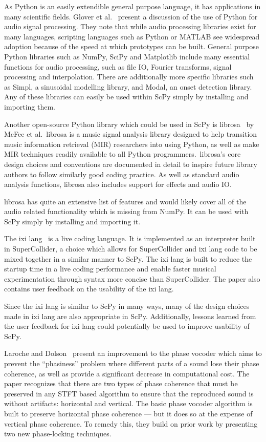\documentclass{article}
\begin{document}
As Python is an easily extendible general purpose language, it has applications in many scientific
fields. Glover et al.~\cite{glover2011python} present a discussion of the use of Python for audio
signal processing. They note that while audio processing libraries exist for many languages,
scripting languages such as Python or MATLAB see widespread adoption because of the speed at which
prototypes can be built. General purpose Python libraries such as NumPy, SciPy and Matplotlib
include many essential functions for audio processing, such as file IO, Fourier transforms, signal
processing and interpolation. There are additionally more specific libraries such as Simpl, a
sinusoidal modelling library, and Modal, an onset detection library. Any of these libraries can
easily be used within ScPy simply by installing and importing them.

Another open-source Python library which could be used in ScPy is librosa~\cite{mcfee2015librosa}
by McFee et al.\ librosa is a music signal analysis library designed to help transition music
information retrieval (MIR) researchers into using Python, as well as make MIR techniques readily
available to all Python programmers.\ librosa's core design choices and conventions are documented
in detail to inspire future library authors to follow similarly good coding practice. As well as
standard audio analysis functions, librosa also includes support for effects and audio IO.\@

librosa has quite an extensive list of features and would likely cover all of the audio related
functionality which is missing from NumPy. It can be used with ScPy simply by installing and importing
it.

The ixi lang~\cite{magnusson2011ixi} is a live coding language. It is implemented as an interpreter
built in SuperCollider, a choice which allows for SuperCollider and ixi lang code to be mixed
together in a similar manner to ScPy. The ixi lang is built to reduce the startup time in a live
coding performance and enable faster musical experimentation through syntax more concise than
SuperCollider. The paper also contains user feedback on the usability of the ixi lang.

Since the ixi lang is similar to ScPy in many ways, many of the design choices made in ixi lang are
also appropriate in ScPy. Additionally, lessons learned from the user feedback for ixi lang could
potentially be used to improve usability of ScPy.

Laroche and Dolson~\cite{laroche1999improved} present an improvement to the phase vocoder which
aims to prevent the ``phasiness'' problem where different parts of a sound lose their phase
coherence, as well as provide a significant decrease in computational cost. The paper recognizes
that there are two types of phase coherence that must be preserved in any STFT based algorithm to
ensure that the reproduced sound is without artifacts: horizontal and vertical. The basic phase
vocoder algorithm is built to preserve horizontal phase coherence --- but it does so at the expense
of vertical phase coherence. To remedy this, they build on prior work by presenting two new
phase-locking techniques.
\end{document}
